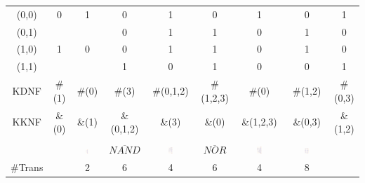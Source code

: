 \begin{table}
\begin{tabular}{|c|c|c|c|c|c|c|c|c|}
\hline
(0,0) & 0 & 1 & 0 & 1 & 0 & 1 & 0 & 1\\
(0,1) &   &   & 0 & 1 & 1 & 0 & 1 & 0\\
(1,0) & 1 & 0 & 0 & 1 & 1 & 0 & 1 & 0\\
(1,1) &   &   & 1 & 0 & 1 & 0 & 0 & 1\\
\hline
KDNF & \#(1) & \#(0) & \#(3) & \#(0,1,2) & \#(1,2,3) & \#(0) & \#(1,2) & \#(0,3) \\
KKNF & \&(0) & \&(1) & \&(0,1,2) & \&(3) & \&(0) & \&(1,2,3) & \&(0,3) & \&(1,2)\\
\hline
& & & & & & & &\\
& & 
\includegraphics[width=0.12\textwidth]{pics/gates_schematic/inverter} &
$ \overline{NAND} $ &
\includegraphics[width=0.12\textwidth]{pics/gates_schematic/NAND} &
$ \overline{NOR} $ &
\includegraphics[width=0.12\textwidth]{pics/gates_schematic/NOR} &
\includegraphics[width=0.12\textwidth]{pics/gates_schematic/XOR} &
\\
\hline
\#Trans & & 2 & 6 & 4 & 6 & 4 & 8 & \\
\hline
\end{tabular}
\end{table}